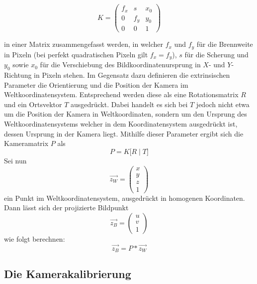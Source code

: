 \begin{equation}
K = \begin{pmatrix}
f_x & s & x_0 \\
0 & f_y & y_0 \\
0 & 0 & 1 
\end{pmatrix}
\end{equation}

 in einer Matrix zusammengefasst werden, in welcher \(f_x\) und \(f_y\) für die Brennweite in Pixeln (bei perfekt quadratischen Pixeln gilt \(f_x = f_y\)), \(s\) für die Scherung und \(y_0\) sowie \(x_0\) für die Verschiebung des Bildkoordinatenursprung in \(X\)- und \(Y\)-Richtung in Pixeln stehen. 
\newline
Im Gegensatz dazu definieren die extrinsischen Parameter die Orientierung und die Position der Kamera im Weltkoordinatensystem. Entsprechend werden diese als eine Rotationsmatrix \(R\) und ein Ortsvektor \(T\) ausgedrückt. Dabei handelt es sich bei \(T\) jedoch nicht etwa um die Position der Kamera in Weltkoordinaten, sondern um den Ursprung des Weltkoordinatensystems welcher in dem Koordinatensystem ausgedrückt ist, dessen Ursprung in der Kamera liegt.
\newline
Mithilfe dieser Parameter ergibt sich die Kameramatrix \(P\) als
\begin{equation}
	P = K \big[ R \mid T \big] 
\end{equation}
Sei nun 
\begin{equation}
	\vec{z_{W}} = \left(\begin{array}{c}x\\y\\z\\1\end{array}\right)
\end{equation}
ein Punkt im Weltkoordinatensystem, ausgedrückt in homogenen Koordinaten. Dann lässt sich der projizierte Bildpunkt
\begin{equation}
	\vec{z_{B}} = \left(\begin{array}{c}u\\v\\1\end{array}\right)
\end{equation}
wie folgt berechnen:
\begin{equation}
	\vec{z_{B}} = P * \vec{z_{W}}
\end{equation}

\newpage

\subsection{Die Kamerakalibrierung}
\label{subsec:KameraKalibrierungTheorie}

